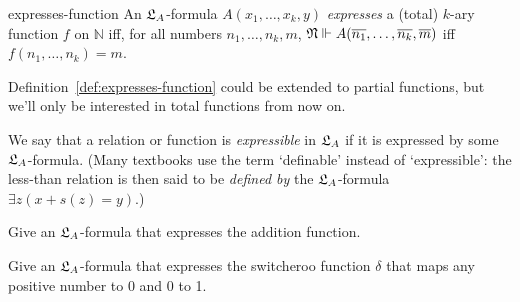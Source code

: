 
\begin{definition}{}{expresses-function}
  An $\mathfrak{L}_{A}$-formula $A(x_{1},\ldots,x_{k},y)$ \emph{expresses} a (total) $k$-ary function $f$ on $\mathbb{N}$ iff,
  for all numbers $n_{1},\ldots,n_{k},m$,
  $\mathfrak{N} \Vdash A(\overline{n_{1}},\ldots,\overline{n_{k}},\overline{m})$ iff $f(n_{1},\ldots,n_{k}) = m$.
\end{definition}
\noindent%
Definition~\ref{def:expresses-function} could be extended to partial functions,
but we'll only be interested in total functions from now on.

We say that a relation or function is \emph{expressible} in $\mathfrak{L}_{A}$ if
it is expressed by some $\mathfrak{L}_{A}$-formula.
(Many textbooks use the term `definable' instead of `expressible':
the less-than relation is then said to be \emph{defined by} the $\mathfrak{L}_A$-formula $\exists z(x + s(z) = y)$.)

\begin{exercise}
  Give an $\mathfrak{L}_A$-formula that expresses the addition function.
\end{exercise}

\begin{exercise}
  Give an $\mathfrak{L}_{A}$-formula that expresses the switcheroo function $\delta$
  that maps any positive number to 0 and 0 to 1.
\end{exercise}



